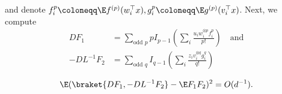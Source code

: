 and denote \(f_i^p \coloneqq \E f^{(p)} (w_i^\top x), g_i^p \coloneqq \E g^{(p)} (v_i^\top x)\). 
Next, we compute
\begin{equation}
    \begin{aligned}
    D F_1 &= \sum_{\text{odd } p} p I_{p -1} \left(\sum_i \frac{u_i w_i^{\otimes p} f_i^p}{p!} \right) \quad \text{and} \\
    -D L^{-1} F_2 &= \sum_{\text{odd } q} I_{q -1} \left(\sum_i \frac{z_i v_i^{\otimes q} g_i^q}{q!} \right)
    \end{aligned}
\end{equation}
\begin{lemma}
    \begin{equation}
        \E (\braket{D F_1, -D L^{-1} F_2} - \E F_1 F_2)^2 = O(d^{-1}).
    \end{equation}
\end{lemma}
